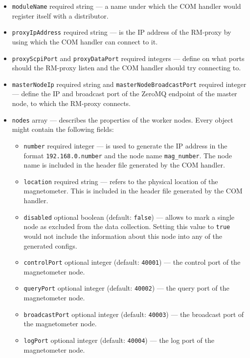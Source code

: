 \begin{itemize}
	\item \texttt{moduleName} required string --- a name under which the COM handler would register itself with a distributor.
	\item \texttt{proxyIpAddress} required string --- is the IP address of the RM-proxy by using which the COM handler can connect to it.
	\item \texttt{proxyScpiPort} and \texttt{proxyDataPort} required integers --- define on what ports should the RM-proxy listen and the COM handler should try connecting to.
	\item \texttt{masterNodeIp} required string and \texttt{masterNodeBroadcastPort} required integer --- define the IP and broadcast port of the ZeroMQ endpoint of the master node, to which the RM-proxy connects.
	\item{
		\texttt{nodes} array --- describes the properties of the worker nodes. Every object might contain the following fields:
		\begin{itemize}
			\item \texttt{number} required integer --- is used to generate the IP address in the format \texttt{192.168.0.number} and the node name \texttt{mag\_number}. The node name is included in the header file generated by the COM handler.
			\item \texttt{location} required string --- refers to the physical location of the magnetometer. This is included in the header file generated by the COM handler.
			\item \texttt{disabled} optional boolean (default: \texttt{false}) --- allows to mark a single node as excluded from the data collection. Setting this value to \texttt{true} would not include the information about this node into any of the generated configs.
			\item \texttt{controlPort} optional integer (default: \texttt{40001}) --- the control port of the magnetometer node.
			\item \texttt{queryPort} optional integer (default: \texttt{40002}) --- the query port of the magnetometer node.
			\item \texttt{broadcastPort} optional integer (default: \texttt{40003}) --- the broadcast port of the magnetometer node.
			\item \texttt{logPort} optional integer (default: \texttt{40004}) --- the log port of the magnetometer node.
		\end{itemize}
	}
\end{itemize}

